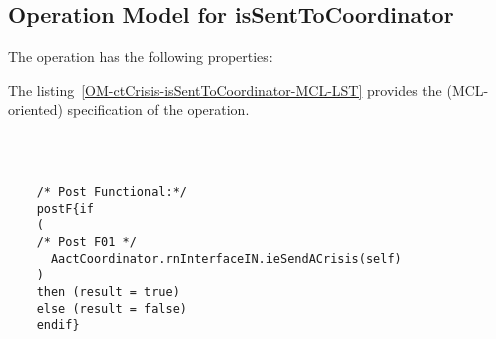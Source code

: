 \subsection{Operation Model for isSentToCoordinator}

\label{OM-isSentToCoordinator}


The  operation has the following properties:

	\begin{operationmodel}



		


	\end{operationmodel}



	\vspace{1cm}
	The listing~\ref{OM-ctCrisis-isSentToCoordinator-MCL-LST} provides the \msrmessir (MCL-oriented) specification of the operation.
	
	\scriptsize
	\vspace{0.5cm}
	\begin{lstlisting}[style=MessirStyle,firstnumber=auto,captionpos=b,caption={\msrmessir (MCL-oriented) specification of the operation \emph{isSentToCoordinator}.},label=OM-ctCrisis-isSentToCoordinator-MCL-LST]

	
	
	/* Post Functional:*/ 
	postF{if 
	(
	/* Post F01 */
	  AactCoordinator.rnInterfaceIN.ieSendACrisis(self)
	)
	then (result = true)
	else (result = false)
	endif}
	
	
	\end{lstlisting}
	\normalsize 
	
	
	
	
	
